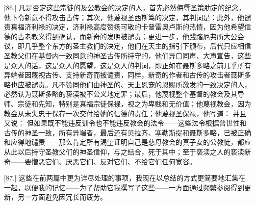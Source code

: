 [86.] 凡是否定这些宗徒的及公教会的决定的人，首先必然侮辱圣策肋定的纪念，他下令新意不得攻击古传；其次，他蔑视圣西斯笃的决定，其判词是：此外，他谴责真福济利禄的决定，济利禄高度赞扬可敬的卡普雷奥卢斯的热情，因为他希望信德的古老教义得到确认，而新奇的发明被谴责；更进一步，他践踏厄弗所大公会议，即几乎整个东方的圣主教们的决定，他们在天主的指引下颁布，后代只应相信圣教父们在基督内一致同意的神圣古传所持守的，他们异口同声、大声宣告，这些是众人的话，这是众人的愿望，这是众人的判词，即正如在聂斯多略之前几乎所有异端者因蔑视古传、支持新奇而被谴责，同样，新奇的作者和古传的攻击者聂斯多略也应被谴责。凡不赞同他们由神圣的、天上恩宠的恩赐所激发的一致决定的人，必然认为聂斯多略的亵渎被不公义地定罪；最后，他蔑视整个基督的教会及其导师、宗徒和先知，特别是真福宗徒保禄，视之为卑贱和无价值；他蔑视教会，因为教会从未失忠于保存一次交付给她的信德的责任；他蔑视圣保禄，他写道： 并且又说： 但如果既不能违反训令也不能违反教会的法令——这些法令根据普世性和古传的神圣一致，所有异端者，最后还有贝拉齐、塞勒斯提和聂斯多略，已被正确和应得地谴责——那么肯定所有渴望证明自己是慈母教会的真子女的公教徒，都应从此以后持守圣教父们的神圣信仰，与之结合，死于其中；至于亵渎之人的亵渎新奇——要憎恶它们、厌恶它们、反对它们、不给它们任何宽容。\par

[87.] 这些在前两篇中更为详尽处理的事项，我现在以总结的方式更简要地汇集在一起，以便我的记忆——为了帮助它我撰写了这些——一方面通过频繁参阅得到更新，另一方面避免因冗长而疲劳。\par

